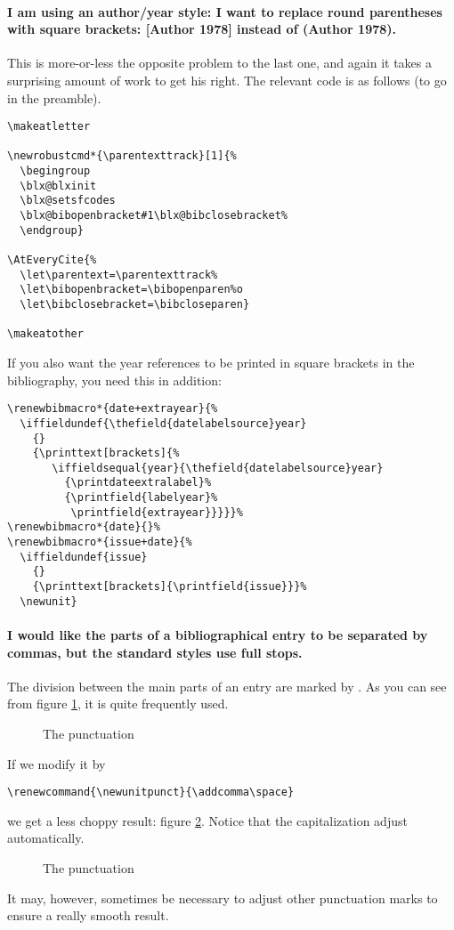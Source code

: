 \paragraph{I am using an author/year style: I want to replace round
  parentheses with square brackets: [Author 1978] instead of (Author
  1978).} This is more-or-less the opposite problem to the last one,
and again it takes a surprising amount of work to get his right. The
relevant code is as follows (to go in the preamble).
\begin{Verbatim}
\makeatletter

\newrobustcmd*{\parentexttrack}[1]{%
  \begingroup
  \blx@blxinit
  \blx@setsfcodes
  \blx@bibopenbracket#1\blx@bibclosebracket%
  \endgroup}

\AtEveryCite{%
  \let\parentext=\parentexttrack%
  \let\bibopenbracket=\bibopenparen%o
  \let\bibclosebracket=\bibcloseparen}

\makeatother
\end{Verbatim}

If you also want the year references to be printed in square brackets
in the bibliography, you need this in addition:
\begin{Verbatim}
\renewbibmacro*{date+extrayear}{%
  \iffieldundef{\thefield{datelabelsource}year}
    {}
    {\printtext[brackets]{%
       \iffieldsequal{year}{\thefield{datelabelsource}year}
         {\printdateextralabel}%
         {\printfield{labelyear}%
          \printfield{extrayear}}}}}%
\renewbibmacro*{date}{}%
\renewbibmacro*{issue+date}{%
  \iffieldundef{issue}
    {}
    {\printtext[brackets]{\printfield{issue}}}%
  \newunit}
\end{Verbatim}

\paragraph{I would like the parts of a bibliographical entry to be
  separated by commas, but the standard styles use full stops.} The
division between the main parts of an entry are marked by
. As you can see from figure \ref{punctcite10}, it is
quite frequently used.
\begin{figure}
\caption{The  punctuation\label{punctcite10}}
\end{figure}

If we modify it by
\begin{Verbatim}
\renewcommand{\newunitpunct}{\addcomma\space}
\end{Verbatim}
we get a less choppy result: figure \ref{punctcite11}. Notice that the
capitalization adjust automatically.\begin{figure}
\caption{The  punctuation\label{punctcite11}}
\end{figure} It may, however, sometimes be necessary to adjust other
punctuation marks to ensure a really smooth result.

